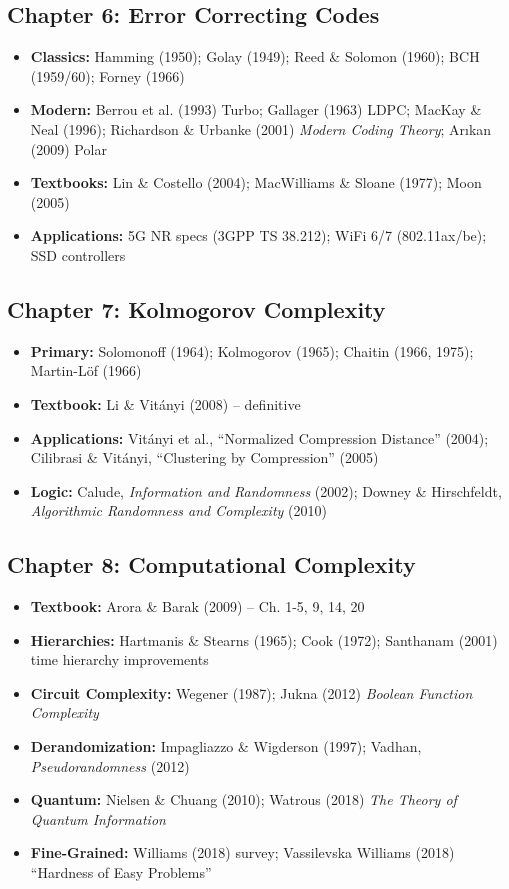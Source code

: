 \subsection{Chapter 6: Error Correcting Codes}
\begin{itemize}
\item \textbf{Classics:} Hamming (1950); Golay (1949); Reed \& Solomon (1960); BCH (1959/60); Forney (1966)
\item \textbf{Modern:} Berrou et al. (1993) Turbo; Gallager (1963) LDPC; MacKay \& Neal (1996); Richardson \& Urbanke (2001) \emph{Modern Coding Theory}; Ar\i kan (2009) Polar
\item \textbf{Textbooks:} Lin \& Costello (2004); MacWilliams \& Sloane (1977); Moon (2005)
\item \textbf{Applications:} 5G NR specs (3GPP TS 38.212); WiFi 6/7 (802.11ax/be); SSD controllers
\end{itemize}

\subsection{Chapter 7: Kolmogorov Complexity}
\begin{itemize}
\item \textbf{Primary:} Solomonoff (1964); Kolmogorov (1965); Chaitin (1966, 1975); Martin-L\"of (1966)
\item \textbf{Textbook:} Li \& Vit\'anyi (2008) -- definitive
\item \textbf{Applications:} Vit\'anyi et al., ``Normalized Compression Distance'' (2004); Cilibrasi \& Vit\'anyi, ``Clustering by Compression'' (2005)
\item \textbf{Logic:} Calude, \emph{Information and Randomness} (2002); Downey \& Hirschfeldt, \emph{Algorithmic Randomness and Complexity} (2010)
\end{itemize}

\subsection{Chapter 8: Computational Complexity}
\begin{itemize}
\item \textbf{Textbook:} Arora \& Barak (2009) -- Ch. 1-5, 9, 14, 20
\item \textbf{Hierarchies:} Hartmanis \& Stearns (1965); Cook (1972); Santhanam (2001) time hierarchy improvements
\item \textbf{Circuit Complexity:} Wegener (1987); Jukna (2012) \emph{Boolean Function Complexity}
\item \textbf{Derandomization:} Impagliazzo \& Wigderson (1997); Vadhan, \emph{Pseudorandomness} (2012)
\item \textbf{Quantum:} Nielsen \& Chuang (2010); Watrous (2018) \emph{The Theory of Quantum Information}
\item \textbf{Fine-Grained:} Williams (2018) survey; Vassilevska Williams (2018) ``Hardness of Easy Problems''
\end{itemize}

